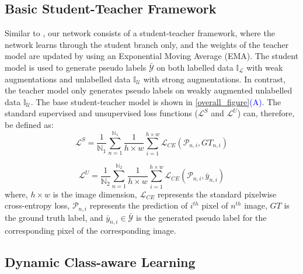 \documentclass[runningheads]{llncs}
\begin{document}
\subsection{Basic Student-Teacher Framework}
Similar to \cite{tarvainen2017mean}, our network consists of a student-teacher framework, where the network learns through the student branch only, and the weights of the teacher model are updated by using an Exponential Moving Average (EMA). The student model is used to generate pseudo labels $\bar{\mathcal{Y}}$ on both labelled data $\mathbb{I}_\mathcal{L}$ with weak augmentations and unlabelled data $\mathbb{I}_\mathcal{U}$ with strong augmentations. In contrast, the teacher model only generates pseudo labels on weakly augmented unlabelled data $\mathbb{I}_\mathcal{U}$. The base student-teacher model is shown in \autoref{overall_figure}\textcolor{blue}{(A)}. The standard supervised and unsupervised loss functions ($\mathcal{L}^S$ and $\mathcal{L}^U$) can, therefore, be defined as:
\begin{equation}
    \mathcal{L}^S = \frac{1}{\mathbb{N}_1}\sum\limits_{n=1}^{\mathbb{N}_1}   \frac{1}{h \times w} \sum\limits_{i=1}^{h\times w} \mathcal{L}_{CE}(\mathcal{P}_{n,i}, GT_{n,i})
\end{equation}

\begin{equation}\label{unsupervised_loss}
    \mathcal{L}^U = \frac{1}{\mathbb{N}_2}\sum\limits_{n=1}^{\mathbb{N}_2}   \frac{1}{h \times w} \sum\limits_{i=1}^{h\times w} \mathcal{L}_{CE}(\mathcal{P}_{n,i}, \bar{{y}}_{n,i})
\end{equation}
where, $h\times w$ is the image dimension, $\mathcal{L}_{CE}$ represents the standard pixelwise cross-entropy loss, $\mathcal{P}_{n,i}$ represents the prediction of $i^{th}$ pixel of $n^{th}$ image, $GT$ is the ground truth label, and $\bar{y}_{n,i}\in{\bar{\mathcal{Y}}}$ is the generated pseudo label for the corresponding pixel of the corresponding image.

\subsection{Dynamic Class-aware Learning}
\end{document}
